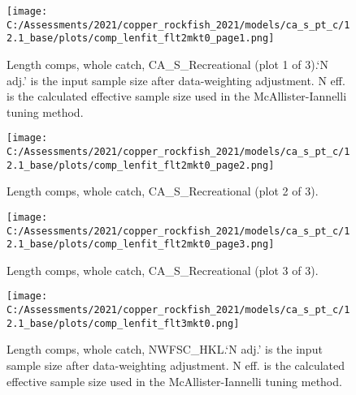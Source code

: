 \documentclass[11pt,
  english,
  a4paper,
]{article}
\begin{document}
\tagmcend\tagstructend


\begin{figure}
\centering
\texttt{[image: C:/Assessments/2021/copper\_rockfish\_2021/models/ca\_s\_pt\_c/12.1\_base/plots/comp\_lenfit\_flt2mkt0\_page1.png]}
\caption{Length comps, whole catch, CA\_S\_Recreational (plot 1 of 3).`N adj.' is the input sample size after data-weighting adjustment. N eff. is the calculated effective sample size used in the McAllister-Iannelli tuning method.\label{fig:comp_lenfit_flt2mkt0_page1}}
\end{figure}

\tagmcend\tagstructend


\begin{figure}
\centering
\texttt{[image: C:/Assessments/2021/copper\_rockfish\_2021/models/ca\_s\_pt\_c/12.1\_base/plots/comp\_lenfit\_flt2mkt0\_page2.png]}
\caption{Length comps, whole catch, CA\_S\_Recreational (plot 2 of 3).\label{fig:comp_lenfit_flt2mkt0_page2}}
\end{figure}

\tagmcend\tagstructend


\begin{figure}
\centering
\texttt{[image: C:/Assessments/2021/copper\_rockfish\_2021/models/ca\_s\_pt\_c/12.1\_base/plots/comp\_lenfit\_flt2mkt0\_page3.png]}
\caption{Length comps, whole catch, CA\_S\_Recreational (plot 3 of 3).\label{fig:comp_lenfit_flt2mkt0_page3}}
\end{figure}

\tagmcend\tagstructend


\begin{figure}
\centering
\texttt{[image: C:/Assessments/2021/copper\_rockfish\_2021/models/ca\_s\_pt\_c/12.1\_base/plots/comp\_lenfit\_flt3mkt0.png]}
\caption{Length comps, whole catch, NWFSC\_HKL.`N adj.' is the input sample size after data-weighting adjustment. N eff. is the calculated effective sample size used in the McAllister-Iannelli tuning method.\label{fig:comp_lenfit_flt3mkt0}}
\end{figure}
\end{document}
